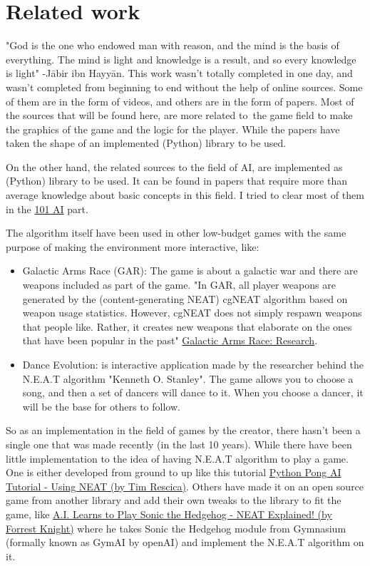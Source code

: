 \chapter{Related work}

"God is the one who endowed man with reason, and the mind is the basis of everything. The mind is light and knowledge is a result, and so every knowledge is light" -Jābir ibn Hayyān. This work wasn’t totally completed in one day, and wasn’t completed from beginning to end without the help of online sources. Some of them are in the form of videos, and others are in the form of papers. Most of the sources that will be found here, are more related to the game field to make the graphics of the game and the logic for the player. While the papers have taken the shape of an implemented (Python) library to be used.

On the other hand, the related sources to the field of AI, are implemented as (Python) library to be used. It can be found in papers that require more than average knowledge about basic concepts in this field. I tried to clear most of them in the \hyperref[sec:101-ai]{101 AI} part.

The algorithm itself have been used in other low-budget games with the same purpose of making the environment more interactive, like:

\begin{itemize}
\item Galactic Arms Race (GAR): The game is about a galactic war and there are weapons included as part of the game. "In GAR, all player weapons are generated by the (content-generating NEAT) cgNEAT algorithm based on weapon usage statistics. However, cgNEAT does not simply respawn weapons that people like. Rather, it creates new weapons that elaborate on the ones that have been popular in the past" \href{http://galacticarmsrace.blogspot.com/p/research.html}{Galactic Arms Race: Research}.

\item Dance Evolution: is interactive application made by the researcher behind the N.E.A.T algorithm "Kenneth O. Stanley". The game allows you to choose a song, and then a set of dancers will dance to it. When you choose a dancer, it will be the base for others to follow.

\end{itemize}

So as an implementation in the field of games by the creator, there hasn't been a single one that was made recently (in the last 10 years). While there have been little implementation to the idea of having N.E.A.T algorithm to play a game. One is either developed from ground to up like this tutorial \href{https://www.youtube.com/watch?v=2f6TmKm7yx0&t}{Python Pong AI Tutorial - Using NEAT (by Tim Rescica)}.  Others have made it on an open source game from another library and add their own tweaks to the library to fit the game, like \href{https://www.youtube.com/watch?v=5RR1T_-zVws&t}{A.I. Learns to Play Sonic the Hedgehog - NEAT Explained! (by Forrest Knight)} where he takes Sonic the Hedgehog module from Gymnasium (formally known as GymAI by openAI) and implement the N.E.A.T algorithm on it.

